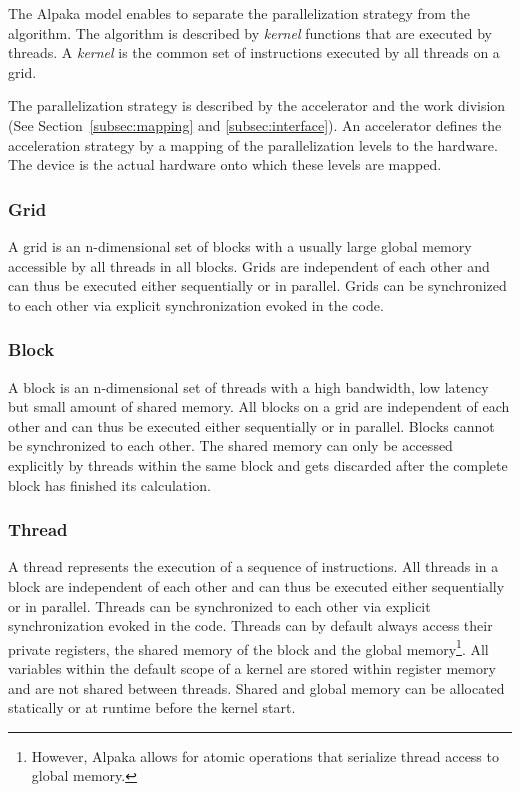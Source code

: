 \documentclass[10pt, twocolumn]{article}
\newcommand{\alpaka}{Alpaka\xspace}
\begin{document}
The \alpaka model enables to separate the parallelization strategy from the algorithm.
The algorithm is described by \emph{kernel} functions that are executed by threads.
A \emph{kernel} is the common set of instructions executed by all threads on a grid.

The parallelization strategy is described by the accelerator and the work division (See Section~\ref{subsec:mapping} and \ref{subsec:interface}).
An accelerator defines the acceleration strategy by a mapping of the parallelization levels to the hardware.
The device is the actual hardware onto which these levels are mapped.
\\
\subsubsection{\textbf{Grid}}
A grid is an n-dimensional set of blocks with a usually large global memory accessible by all threads in all blocks.
Grids are independent of each other and can thus be executed either sequentially or in parallel. Grids can be synchronized to each other via explicit synchronization evoked in the code.

\subsubsection{\textbf{Block}}
A block is an n-dimensional set of threads with a high bandwidth, low latency but small amount of shared memory.
All blocks on a grid are independent of each other and can thus be executed either sequentially or in parallel. Blocks cannot be synchronized to each other.
The shared memory can only be accessed explicitly by threads within the same block and gets discarded after the complete block has finished its calculation.

\subsubsection{\textbf{Thread}}
A thread represents the execution of a sequence of instructions.
All threads in a block are independent of each other and can thus be executed either sequentially or in parallel. Threads can be synchronized to each other via explicit synchronization evoked in the code.
Threads can by default always access their private registers, the shared memory of the block and the global memory\footnote{However, \alpaka allows for atomic operations that serialize thread access to global memory.}.
All variables within the default scope of a kernel are stored within register memory and are not shared between threads.
Shared and global memory can be allocated statically or at runtime before the kernel start.
\end{document}
